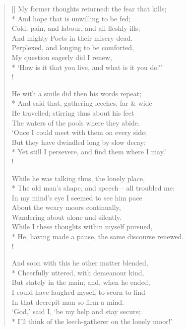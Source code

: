 \documentclass[MAIN]{subfiles}
\begin{document}
\begin{verse}[\versewidth]
My former thoughts returned: the fear that kills;\\*
\vin And hope that is unwilling to be fed;\\
Cold, pain, and labour, and all fleshly ills;\\
\vin And mighty Poets in their misery dead.\\
\vin Perplexed, and longing to be comforted,\\
My question eagerly did I renew,\\*
`How is it that you live, and what is it you do?'\\!

He with a smile did then his words repeat;\\*
\vin And said that, gathering leeches, far \& wide\\
He travelled; stirring thus about his feet\\
\vin The waters of the pools where they abide.\\
\vin `Once I could meet with them on every side;\\
But they have dwindled long by slow decay;\\*
Yet still I persevere, and find them where I may.'\\!

While he was talking thus, the lonely place,\\*
\vin The old man's shape, and speech -- all troubled me:\\ 
In my mind's eye I seemed to see him pace\\
\vin About the weary moors continually,\\
\vin Wandering about alone and silently.\\
While I these thoughts within myself pursued,\\*
He, having made a pause, the same discourse renewed.\\!

And soon with this he other matter blended,\\*
\vin Cheerfully uttered, with demeanour kind,\\
But stately in the main; and, when he ended,\\
\vin I could have laughed myself to scorn to find\\
\vin In that decrepit man so firm a mind.\\
`God,' said I, `be my help and stay secure;\\*
I'll think of the leech-gatherer on the lonely moor!'
\end{verse}
\end{document}
